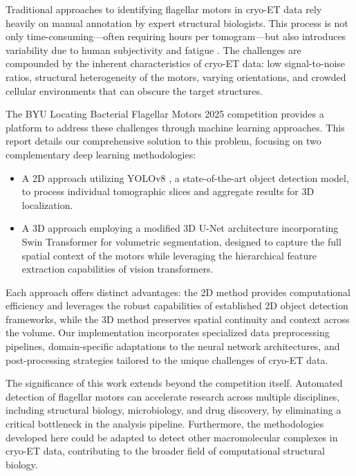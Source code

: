\documentclass{article}
\begin{document}
Traditional approaches to identifying flagellar motors in cryo-ET data rely heavily on manual annotation by expert structural biologists. This process is not only time-consuming—often requiring hours per tomogram—but also introduces variability due to human subjectivity and fatigue \cite{lucicCryoelectronTomographyChallenge2013}. The challenges are compounded by the inherent characteristics of cryo-ET data: low signal-to-noise ratios, structural heterogeneity of the motors, varying orientations, and crowded cellular environments that can obscure the target structures.

The BYU Locating Bacterial Flagellar Motors 2025 competition \cite{byu-locating-bacterial-flagellar-motors-2025} provides a platform to address these challenges through machine learning approaches. This report details our comprehensive solution to this problem, focusing on two complementary deep learning methodologies:

\begin{itemize}
    \item A 2D approach utilizing YOLOv8 \cite{jocherUltralyticsYolov5V702022}, a state-of-the-art object detection model, to process individual tomographic slices and aggregate results for 3D localization.
    \item A 3D approach employing a modified 3D U-Net architecture incorporating Swin Transformer \cite{hatamizadehSwinUNETRSwin2022}\cite{cicek3DUNetLearning2016} for volumetric segmentation, designed to capture the full spatial context of the motors while leveraging the hierarchical feature extraction capabilities of vision transformers.
\end{itemize}

Each approach offers distinct advantages: the 2D method provides computational efficiency and leverages the robust capabilities of established 2D object detection frameworks, while the 3D method preserves spatial continuity and context across the volume. Our implementation incorporates specialized data preprocessing pipelines, domain-specific adaptations to the neural network architectures, and post-processing strategies tailored to the unique challenges of cryo-ET data.

The significance of this work extends beyond the competition itself. Automated detection of flagellar motors can accelerate research across multiple disciplines, including structural biology, microbiology, and drug discovery, by eliminating a critical bottleneck in the analysis pipeline. Furthermore, the methodologies developed here could be adapted to detect other macromolecular complexes in cryo-ET data, contributing to the broader field of computational structural biology.
\end{document}
